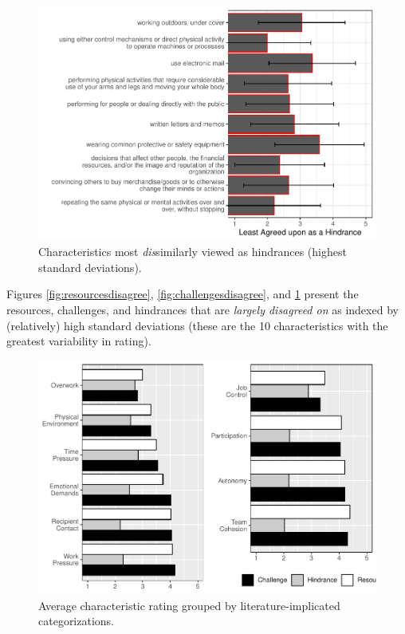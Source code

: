 \documentclass[
  man]{apa6}
\begin{document}
\begin{figure}
\centering
\includegraphics{Submission_files/figure-latex/hindrancesdisagree-1.pdf}
\caption{\label{fig:hindrancesdisagree}Characteristics most \emph{dis}similarly viewed as hindrances (highest standard deviations).}
\end{figure}

Figures \ref{fig:resourcesdisagree}, \ref{fig:challengesdisagree}, and \ref{fig:hindrancesdisagree} present the resources, challenges, and hindrances that are \emph{largely disagreed on} as indexed by (relatively) high standard deviations (these are the 10 characteristics with the greatest variability in rating).

\begin{figure}
\centering
\includegraphics{Submission_files/figure-latex/scalelevelgraphs-1.pdf}
\caption{\label{fig:scalelevelgraphs}Average characteristic rating grouped by literature-implicated categorizations.}
\end{figure}
\end{document}
